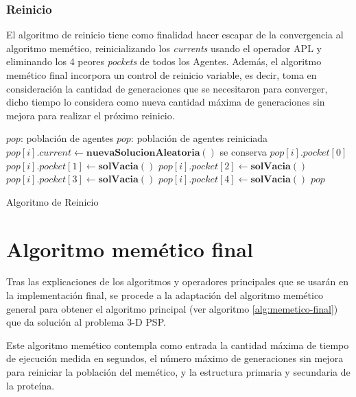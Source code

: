 \subsubsection{Reinicio}
El algoritmo de reinicio tiene como finalidad hacer escapar de la convergencia al algoritmo memético, reinicializando los \textit{currents} usando el operador APL y eliminando los 4 peores \textit{pockets} de todos los Agentes. Además, el algoritmo memético final incorpora un control de reinicio variable, es decir, toma en consideración la cantidad de generaciones que se necesitaron para converger, dicho tiempo lo considera como nueva cantidad máxima de generaciones sin mejora para realizar el próximo reinicio.
\\[25pt]
\begin{algorithm}[H]
	\begin{algorithmic}[1]
		\REQUIRE $pop$: población de agentes
		\ENSURE $pop$: población de agentes reiniciada
			\STATE $pop[i].current\gets \textbf{nuevaSolucionAleatoria}()$
			\STATE \COMMENT se conserva $pop[i].pocket[0]$
			\STATE $pop[i].pocket[1] \gets \textbf{solVacia}()$
			\STATE $pop[i].pocket[2] \gets \textbf{solVacia}()$
			\STATE $pop[i].pocket[3] \gets \textbf{solVacia}()$
			\STATE $pop[i].pocket[4] \gets \textbf{solVacia}()$
		\ENDFOR
		\RETURN $pop$
	\end{algorithmic}
	\caption{Algoritmo de Reinicio}
	\label{alg:memetico-restart}
\end{algorithm}

\section{Algoritmo memético final}
Tras las explicaciones de los algoritmos y operadores principales que se usarán en la implementación final, se procede a la adaptación del algoritmo memético general para obtener el algoritmo principal (ver algoritmo \ref{alg:memetico-final}) que da solución al problema 3-D PSP.

Este algoritmo memético contempla como entrada la cantidad máxima de tiempo de ejecución medida en segundos, el número máximo de generaciones sin mejora para reiniciar la población del memético, y la estructura primaria y secundaria de la proteína.

